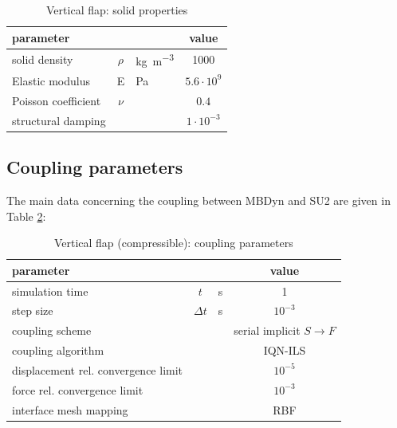 \begin{table}[!htb]
	\begin{center}
		\begin{tabular}{ l c  l | c } 
			parameter & & & value   \\ 
			\hline
			solid density  & $\rho$ & \si{kg.m^{-3}} & 1000    \\
			Elastic modulus  & E & \si{Pa} & $ 5.6 \cdot 10^9$    \\
			Poisson coefficient & $\nu$ & & $0.4$  \\
			structural damping & & & $1 \cdot 10^{-3}$ \\
		\end{tabular}
	\end{center}
	\caption{Vertical flap: solid properties}
	\label{table:comp-solid}
\end{table}

\subsection{Coupling parameters}

The main data concerning the coupling between MBDyn and SU2 are given in Table \ref{table:comp-coupling}:

\begin{table}[!htb]
	\begin{center}
		\begin{tabular}{ l c  l| c } 
			parameter & & & value   \\ 
			\hline
			simulation time  & $t$& \si{s} & 1      \\
			step size & $\Delta t$ & \si{s} & $10^{-3}$   \\
			\hline
			coupling scheme & & & serial implicit $S\rightarrow F$  \\
			coupling algorithm & & &  IQN-ILS  \\
			displacement rel. convergence limit & & & $10^{-5}$ \\
			force rel. convergence limit &&  & $10^{-3}$  \\
      		interface mesh mapping & & & RBF  \\
			
		\end{tabular}
	\end{center}
	\caption{Vertical flap (compressible): coupling parameters}
	\label{table:comp-coupling}
\end{table}


